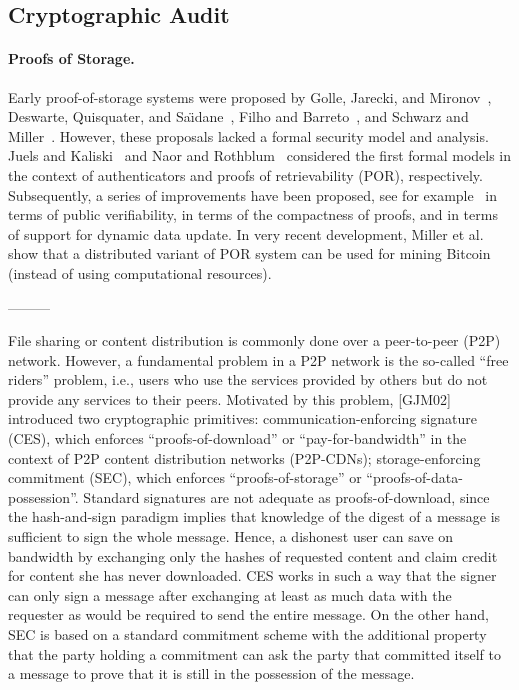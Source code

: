 \subsection{Cryptographic Audit}

\paragraph{Proofs of Storage.}
Early proof-of-storage systems were proposed by Golle, Jarecki, and Mironov~\cite{GJM02}, Deswarte, Quisquater, and Sa\"{\i}dane~\cite{DQS03}, Filho and Barreto~\cite{FB06}, and Schwarz and Miller~\cite{SM06}.
However, these proposals lacked a formal security model and analysis.
Juels and Kaliski~\cite{JK07} and Naor and Rothblum~\cite{NR09} considered the first formal models in the context of authenticators and proofs of retrievability (POR), respectively.
Subsequently, a series of improvements have been proposed, see for example~\cite{ABC+11} in terms of public verifiability, \cite{SW13} in terms of the compactness of proofs, and \cite{SDJ+12,CKW13,SSP13} in terms of support for dynamic data update.
In very recent development, Miller et al.~\cite{MJS+14} show that a distributed variant of POR system can be used for mining Bitcoin (instead of using computational resources).


---------

File sharing or content distribution is commonly done over a peer-to-peer (P2P) network. However, a fundamental problem in a P2P network is the so-called ``free riders'' problem, i.e., users who use the services provided by others but do not provide any services to their peers. Motivated by this problem, [GJM02] introduced two cryptographic primitives:
communication-enforcing signature (CES), which enforces ``proofs-of-download'' or ``pay-for-bandwidth'' in the context of P2P content distribution networks (P2P-CDNs);
storage-enforcing commitment (SEC), which enforces ``proofs-of-storage'' or ``proofs-of-data-possession''.
Standard signatures are not adequate as proofs-of-download, since the hash-and-sign paradigm implies that knowledge of the digest of a message is sufficient to sign the whole message. Hence, a dishonest user can save on bandwidth by exchanging only the hashes of requested content and claim credit for content she has never downloaded. CES works in such a way that the signer can only sign a message after exchanging at least as much data with the requester as would be required to send the entire message. On the other hand, SEC is based on a standard commitment scheme with the additional property that the party holding a commitment can ask the party that committed itself to a message to prove that it is still in the possession of the message.

